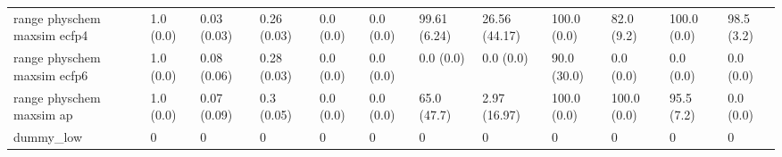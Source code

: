 \begin{tabular}{llllllllllll}
range physchem maxsim ecfp4 & {\cellcolor[HTML]{F6FCFD}} \color[HTML]{000000} 1.0 (0.0) & {\cellcolor[HTML]{F7FCFD}} \color[HTML]{000000} 0.03 (0.03) & {\cellcolor[HTML]{56BA91}} \color[HTML]{F1F1F1} 0.26 (0.03) & {\cellcolor[HTML]{F7FCFD}} \color[HTML]{000000} 0.0 (0.0) & {\cellcolor[HTML]{F7FCFD}} \color[HTML]{000000} 0.0 (0.0) & {\cellcolor[HTML]{00441B}} \color[HTML]{F1F1F1} 99.61 (6.24) & {\cellcolor[HTML]{C5E9E2}} \color[HTML]{000000} 26.56 (44.17) & {\cellcolor[HTML]{00441B}} \color[HTML]{F1F1F1} 100.0 (0.0) & {\cellcolor[HTML]{00441B}} \color[HTML]{F1F1F1} 82.0 (9.2) & {\cellcolor[HTML]{005221}} \color[HTML]{F1F1F1} 100.0 (0.0) & {\cellcolor[HTML]{F7FCFD}} \color[HTML]{000000} 98.5 (3.2) \\
range physchem maxsim ecfp6 & {\cellcolor[HTML]{F6FCFD}} \color[HTML]{000000} 1.0 (0.0) & {\cellcolor[HTML]{F6FCFD}} \color[HTML]{000000} 0.08 (0.06) & {\cellcolor[HTML]{60BF9C}} \color[HTML]{000000} 0.28 (0.03) & {\cellcolor[HTML]{F7FCFD}} \color[HTML]{000000} 0.0 (0.0) & {\cellcolor[HTML]{F7FCFD}} \color[HTML]{000000} 0.0 (0.0) & {\cellcolor[HTML]{F7FCFD}} \color[HTML]{000000} 0.0 (0.0) & {\cellcolor[HTML]{F7FCFD}} \color[HTML]{000000} 0.0 (0.0) & {\cellcolor[HTML]{00441B}} \color[HTML]{F1F1F1} 90.0 (30.0) & {\cellcolor[HTML]{00441B}} \color[HTML]{F1F1F1} 0.0 (0.0) & {\cellcolor[HTML]{107A37}} \color[HTML]{F1F1F1} 0.0 (0.0) & {\cellcolor[HTML]{D6F0EE}} \color[HTML]{000000} 0.0 (0.0) \\
range physchem maxsim ap & {\cellcolor[HTML]{F6FCFD}} \color[HTML]{000000} 1.0 (0.0) & {\cellcolor[HTML]{F7FCFD}} \color[HTML]{000000} 0.07 (0.09) & {\cellcolor[HTML]{52B78B}} \color[HTML]{F1F1F1} 0.3 (0.05) & {\cellcolor[HTML]{F7FCFD}} \color[HTML]{000000} 0.0 (0.0) & {\cellcolor[HTML]{F7FCFD}} \color[HTML]{000000} 0.0 (0.0) & {\cellcolor[HTML]{3BA76C}} \color[HTML]{F1F1F1} 65.0 (47.7) & {\cellcolor[HTML]{F3FAFC}} \color[HTML]{000000} 2.97 (16.97) & {\cellcolor[HTML]{00441B}} \color[HTML]{F1F1F1} 100.0 (0.0) & {\cellcolor[HTML]{00441B}} \color[HTML]{F1F1F1} 100.0 (0.0) & {\cellcolor[HTML]{004E1F}} \color[HTML]{F1F1F1} 95.5 (7.2) & {\cellcolor[HTML]{F7FCFD}} \color[HTML]{000000} 0.0 (0.0) \\
dummy_low & {\cellcolor[HTML]{F7FCFD}} \color[HTML]{000000} 0 & {\cellcolor[HTML]{F7FCFD}} \color[HTML]{000000} 0 & {\cellcolor[HTML]{F7FCFD}} \color[HTML]{000000} 0 & {\cellcolor[HTML]{F7FCFD}} \color[HTML]{000000} 0 & {\cellcolor[HTML]{F7FCFD}} \color[HTML]{000000} 0 & {\cellcolor[HTML]{F7FCFD}} \color[HTML]{000000} 0 & {\cellcolor[HTML]{F7FCFD}} \color[HTML]{000000} 0 & {\cellcolor[HTML]{F7FCFD}} \color[HTML]{000000} 0 & {\cellcolor[HTML]{F7FCFD}} \color[HTML]{000000} 0 & {\cellcolor[HTML]{F7FCFD}} \color[HTML]{000000} 0 & {\cellcolor[HTML]{F7FCFD}} \color[HTML]{000000} 0 \\

\end{tabular}
